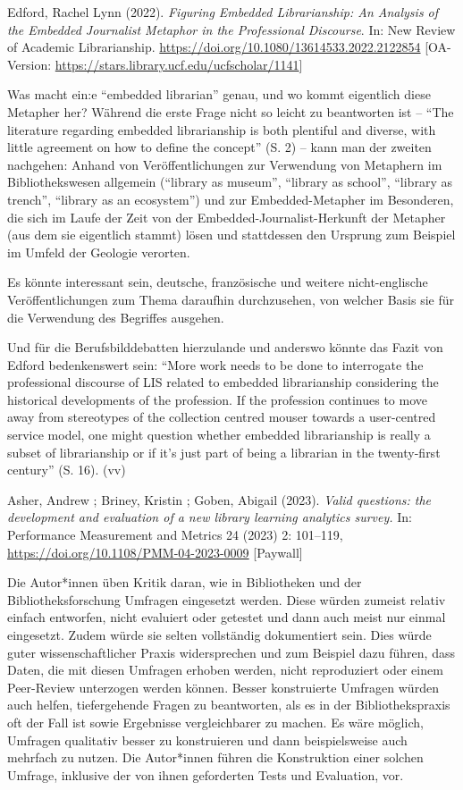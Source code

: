 \documentclass[a4paper,
fontsize=11pt,
oneside,
numbers=noperiodatend,
parskip=half-,
bibliography=totoc,
final
]{scrartcl}
\begin{document}
Edford, Rachel Lynn (2022). \emph{Figuring Embedded Librarianship: An
Analysis of the Embedded Journalist Metaphor in the Professional
Discourse}. In: New Review of Academic Librarianship.
\url{https://doi.org/10.1080/13614533.2022.2122854} {[}OA-Version:
\url{https://stars.library.ucf.edu/ucfscholar/1141}{]}

Was macht ein:e \enquote{embedded librarian} genau, und wo kommt
eigentlich diese Metapher her? Während die erste Frage nicht so leicht
zu beantworten ist -- \enquote{The literature regarding embedded
librarianship is both plentiful and diverse, with little agreement on
how to define the concept} (S. 2) -- kann man der zweiten nachgehen:
Anhand von Veröffentlichungen zur Verwendung von Metaphern im
Bibliothekswesen allgemein (\enquote{library as museum},
\enquote{library as school}, \enquote{library as trench},
\enquote{library as an ecosystem}) und zur Embedded-Metapher im
Besonderen, die sich im Laufe der Zeit von der
Embedded-Journalist-Herkunft der Metapher (aus dem sie eigentlich
stammt) lösen und stattdessen den Ursprung zum Beispiel im Umfeld der
Geologie verorten.

Es könnte interessant sein, deutsche, französische und weitere
nicht-englische Veröffentlichungen zum Thema daraufhin durchzusehen, von
welcher Basis sie für die Verwendung des Begriffes ausgehen.

Und für die Berufsbilddebatten hierzulande und anderswo könnte das Fazit
von Edford bedenkenswert sein: \enquote{More work needs to be done to
interrogate the professional discourse of LIS related to embedded
librarianship considering the historical developments of the profession.
If the profession continues to move away from stereotypes of the
collection centred mouser towards a user-centred service model, one
might question whether embedded librarianship is really a subset of
librarianship or if it's just part of being a librarian in the
twenty-first century} (S. 16). (vv)

Asher, Andrew ; Briney, Kristin ; Goben, Abigail (2023). \emph{Valid
questions: the development and evaluation of a new library learning
analytics survey.} In: Performance Measurement and Metrics 24 (2023) 2:
101--119, \url{https://doi.org/10.1108/PMM-04-2023-0009} {[}Paywall{]}

Die Autor*innen üben Kritik daran, wie in Bibliotheken und der
Bibliotheksforschung Umfragen eingesetzt werden. Diese würden zumeist
relativ einfach entworfen, nicht evaluiert oder getestet und dann auch
meist nur einmal eingesetzt. Zudem würde sie selten vollständig
dokumentiert sein. Dies würde guter wissenschaftlicher Praxis
widersprechen und zum Beispiel dazu führen, dass Daten, die mit diesen
Umfragen erhoben werden, nicht reproduziert oder einem Peer-Review
unterzogen werden können. Besser konstruierte Umfragen würden auch
helfen, tiefergehende Fragen zu beantworten, als es in der
Bibliothekspraxis oft der Fall ist sowie Ergebnisse vergleichbarer zu
machen. Es wäre möglich, Umfragen qualitativ besser zu konstruieren und
dann beispielsweise auch mehrfach zu nutzen. Die Autor*innen führen die
Konstruktion einer solchen Umfrage, inklusive der von ihnen geforderten
Tests und Evaluation, vor.
\end{document}
